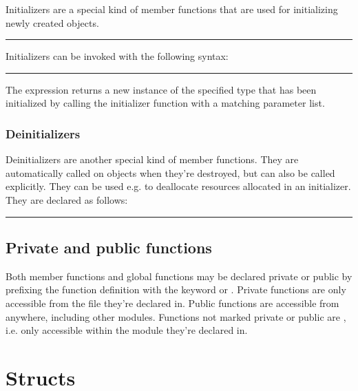 Initializers are a special kind of member functions that are used for
initializing newly created objects.

\begin{grammar}
\rule{initializer-definition}  \code{(}  \code{)} \code{\{}  \code{\}}
\end{grammar}

Initializers can be invoked with the following syntax:

\begin{grammar}
\rule{initializer-call}  \code{(}  \code{)}
\end{grammar}

The  expression returns a new instance of the
specified type that has been initialized by calling the initializer function
with a matching parameter list.

\subsubsection{Deinitializers}

Deinitializers are another special kind of member functions. They are
automatically called on objects when they're destroyed, but can also be called
explicitly. They can be used e.g. to deallocate resources allocated in an
initializer. They are declared as follows:

\begin{grammar}
\rule{deinitializer-definition}  \code{(} \code{)} \code{\{}  \code{\}}
\end{grammar}

\subsection{Private and public functions}

Both member functions and global functions may be declared private or public by
prefixing the function definition with the keyword  or
. Private functions are only accessible from the file they're
declared in. Public functions are accessible from anywhere, including other
modules. Functions not marked private or public are
, i.e. only accessible within the module they're
declared in.

\section{Structs}

